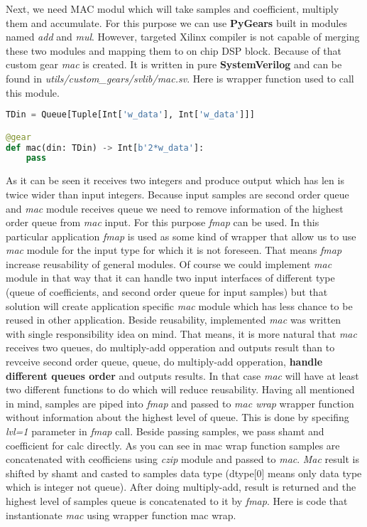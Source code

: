 \documentclass[a4paper, 12pt]{article}
\begin{document}
Next, we need MAC modul which will take samples and coefficient, multiply them and accumulate. For this purpose we can use \textbf{PyGears} built in modules named \textit{add} and \textit{mul}. However, targeted Xilinx compiler is not capable of merging these two modules and mapping them to on chip DSP block. Because of that custom gear \textit{mac} is created. It is written in pure \textbf{SystemVerilog} and can be found in \textit{utils/custom\_gears/svlib/mac.sv}. Here is wrapper function used to call this module.

\begin{lstlisting}[language=Python, caption=MAC wrapper function]
TDin = Queue[Tuple[Int['w_data'], Int['w_data']]]

@gear
def mac(din: TDin) -> Int[b'2*w_data']:
    pass
\end{lstlisting}

As it can be seen it receives two integers and produce output which has len  is twice wider than input integers.
Because input samples are second order queue and \textit{mac} module receives queue we need to remove information of the highest order queue from \textit{mac} input. For this purpose \textit{fmap} can be used. In this particular application \textit{fmap} is used as some kind of wrapper that allow us to use \textit{mac} module for the input type for which it is not foreseen. That means \textit{fmap} increase reusability of general modules. Of course we could implement \textit{mac} module in that way that it can handle two input interfaces of different type (queue of coefficients, and second order queue for input samples) but that solution will create application specific \textit{mac} module which has less chance to be reused in other application. Beside reusability, implemented \textit{mac} was written with single responsibility idea on mind. That means, it is more natural that \textit{mac} receives two queues, do multiply-add opperation and outputs result than to revceive second order queue, queue, do multiply-add opperation, \textbf{handle different queues order} and outputs results. In that case \textit{mac} will have at least two different functions to do which will reduce reusability.
Having all mentioned in mind, samples are piped into \textit{fmap} and  passed to \textit{mac wrap} wrapper function without information about the highest level of queue. This is done by specifing \textit{lvl=1} parameter in \textit{fmap} call. Beside passing samples, we pass shamt and coefficient for calc directly. As you can see in mac wrap function samples are concatenated with ceofficiens using \textit{czip} module and passed to \textit{mac}. \textit{Mac} result is shifted by shamt and casted to samples data type (dtype[0] means only data type which is integer not queue). After doing multiply-add, result is returned and the highest level of samples queue is concatenated to it by \textit{fmap}.
Here is code that instantionate \textit{mac} using wrapper function mac wrap.
\end{document}
